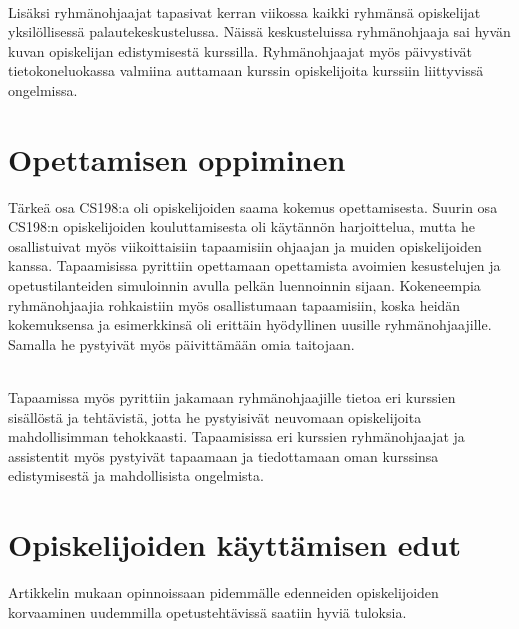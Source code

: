 \documentclass[finnish]{tktltiki2}
\theoremstyle{definition}
\theoremstyle{remark}
\begin{document}
\\

Lisäksi ryhmänohjaajat tapasivat kerran viikossa kaikki ryhmänsä opiskelijat yksilöllisessä palautekeskustelussa. Näissä keskusteluissa ryhmänohjaaja sai hyvän kuvan opiskelijan edistymisestä kurssilla. Ryhmänohjaajat myös päivystivät tietokoneluokassa valmiina auttamaan kurssin opiskelijoita kurssiin liittyvissä ongelmissa.





\section{Opettamisen oppiminen}

Tärkeä osa CS198:a oli opiskelijoiden saama kokemus opettamisesta. Suurin osa CS198:n opiskelijoiden kouluttamisesta oli käytännön harjoittelua, mutta he osallistuivat myös viikoittaisiin tapaamisiin ohjaajan ja muiden opiskelijoiden kanssa. Tapaamisissa pyrittiin opettamaan opettamista avoimien kesustelujen ja opetustilanteiden simuloinnin avulla pelkän luennoinnin sijaan. Kokeneempia ryhmänohjaajia rohkaistiin myös osallistumaan tapaamisiin, koska heidän kokemuksensa ja esimerkkinsä oli erittäin hyödyllinen uusille ryhmänohjaajille. Samalla he pystyivät myös päivittämään omia taitojaan. 

\\

Tapaamissa myös pyrittiin jakamaan ryhmänohjaajille tietoa eri kurssien sisällöstä ja tehtävistä, jotta he pystyisivät neuvomaan opiskelijoita mahdollisimman tehokkaasti. Tapaamisissa eri kurssien ryhmänohjaajat ja assistentit myös pystyivät tapaamaan ja tiedottamaan oman kurssinsa edistymisestä ja mahdollisista ongelmista.


\section{Opiskelijoiden käyttämisen edut}

Artikkelin mukaan opinnoissaan pidemmälle edenneiden opiskelijoiden korvaaminen uudemmilla opetustehtävissä saatiin hyviä tuloksia.  





\end{document}
